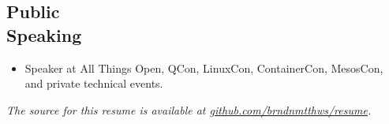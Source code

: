 \documentclass[margin,line]{resume}
\begin{document}
\begin{resume}
\vspace{8pt}

\section{Public\\Speaking}

\begin{itemize}[partopsep=0mm]
    \item Speaker at All Things Open, QCon, LinuxCon, ContainerCon, MesosCon, and private technical events.
\end{itemize}

\end{resume}

\vspace*{\fill}

\textit{The source for this resume is available at \href{https://github.com/brndnmtthws/resume}{github.com/brndnmtthws/resume}.}
\end{document}

